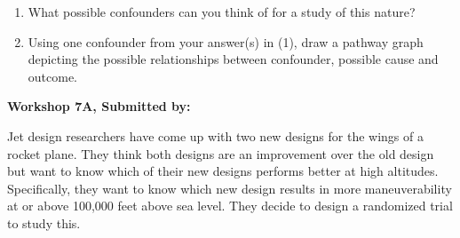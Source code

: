 \documentclass[11pt, chapterprefix=true]{scrbook}\usepackage[]{graphicx}\usepackage[]{color}
\begin{document}
\begin{exercises}
\begin{exercise}
\begin{enumerate}
  \item What possible confounders can you think of for a study of this nature?
  \item Using one confounder from your answer(s) in (1), draw a pathway graph depicting the possible relationships between confounder, possible cause and outcome.
\end{enumerate}
\end{exercise}
\begin{solution}  %

\end{solution}


\clearpage

    \begin{exercise}  %

    \begin{center}
\begin{flushleft}\textbf{\large \hfill Workshop 7A, Submitted by: }\end{flushleft}

\end{center}

Jet design researchers have come up with two new designs for the wings of a rocket plane. They think both designs are an improvement over the old design but want to know which of their new designs performs better at high altitudes. Specifically, they want to know which new design results in more maneuverability at or above 100,000 feet above sea level. They decide to design a randomized trial to study this.



\end{exercise}
\end{exercises}
\end{document}
